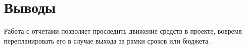 \chapter{Выводы}

Работа с отчетами позволяет проследить движение средств в проекте, вовремя перепланировать его в случае выхода за рамки сроков или бюджета.